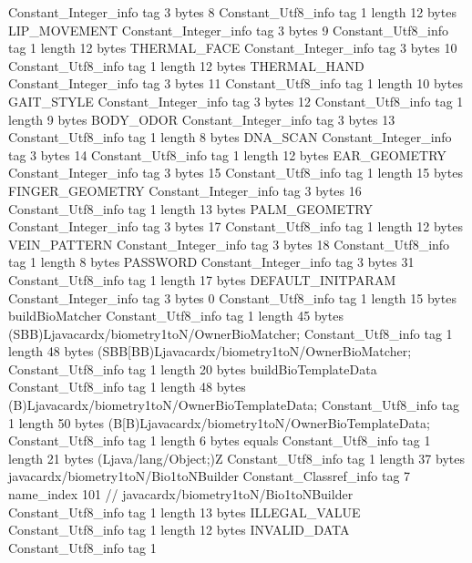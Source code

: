 {{{		}
		Constant_Integer_info {
			tag	3
			bytes	8
		}
		Constant_Utf8_info {
			tag	1
			length	12
			bytes	LIP_MOVEMENT
		}
		Constant_Integer_info {
			tag	3
			bytes	9
		}
		Constant_Utf8_info {
			tag	1
			length	12
			bytes	THERMAL_FACE
		}
		Constant_Integer_info {
			tag	3
			bytes	10
		}
		Constant_Utf8_info {
			tag	1
			length	12
			bytes	THERMAL_HAND
		}
		Constant_Integer_info {
			tag	3
			bytes	11
		}
		Constant_Utf8_info {
			tag	1
			length	10
			bytes	GAIT_STYLE
		}
		Constant_Integer_info {
			tag	3
			bytes	12
		}
		Constant_Utf8_info {
			tag	1
			length	9
			bytes	BODY_ODOR
		}
		Constant_Integer_info {
			tag	3
			bytes	13
		}
		Constant_Utf8_info {
			tag	1
			length	8
			bytes	DNA_SCAN
		}
		Constant_Integer_info {
			tag	3
			bytes	14
		}
		Constant_Utf8_info {
			tag	1
			length	12
			bytes	EAR_GEOMETRY
		}
		Constant_Integer_info {
			tag	3
			bytes	15
		}
		Constant_Utf8_info {
			tag	1
			length	15
			bytes	FINGER_GEOMETRY
		}
		Constant_Integer_info {
			tag	3
			bytes	16
		}
		Constant_Utf8_info {
			tag	1
			length	13
			bytes	PALM_GEOMETRY
		}
		Constant_Integer_info {
			tag	3
			bytes	17
		}
		Constant_Utf8_info {
			tag	1
			length	12
			bytes	VEIN_PATTERN
		}
		Constant_Integer_info {
			tag	3
			bytes	18
		}
		Constant_Utf8_info {
			tag	1
			length	8
			bytes	PASSWORD
		}
		Constant_Integer_info {
			tag	3
			bytes	31
		}
		Constant_Utf8_info {
			tag	1
			length	17
			bytes	DEFAULT_INITPARAM
		}
		Constant_Integer_info {
			tag	3
			bytes	0
		}
		Constant_Utf8_info {
			tag	1
			length	15
			bytes	buildBioMatcher
		}
		Constant_Utf8_info {
			tag	1
			length	45
			bytes	(SBB)Ljavacardx/biometry1toN/OwnerBioMatcher;
		}
		Constant_Utf8_info {
			tag	1
			length	48
			bytes	(SBB[BB)Ljavacardx/biometry1toN/OwnerBioMatcher;
		}
		Constant_Utf8_info {
			tag	1
			length	20
			bytes	buildBioTemplateData
		}
		Constant_Utf8_info {
			tag	1
			length	48
			bytes	(B)Ljavacardx/biometry1toN/OwnerBioTemplateData;
		}
		Constant_Utf8_info {
			tag	1
			length	50
			bytes	(B[B)Ljavacardx/biometry1toN/OwnerBioTemplateData;
		}
		Constant_Utf8_info {
			tag	1
			length	6
			bytes	equals
		}
		Constant_Utf8_info {
			tag	1
			length	21
			bytes	(Ljava/lang/Object;)Z
		}
		Constant_Utf8_info {
			tag	1
			length	37
			bytes	javacardx/biometry1toN/Bio1toNBuilder
		}
		Constant_Classref_info {
			tag	7
			name_index	101		// javacardx/biometry1toN/Bio1toNBuilder
		}
		Constant_Utf8_info {
			tag	1
			length	13
			bytes	ILLEGAL_VALUE
		}
		Constant_Utf8_info {
			tag	1
			length	12
			bytes	INVALID_DATA
		}
		Constant_Utf8_info {
			tag	1
}}}
